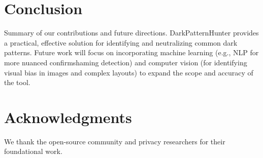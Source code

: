 \documentclass[journal]{IEEEtran}
\begin{document}
\section{Conclusion}
Summary of our contributions and future directions. DarkPatternHunter provides a practical, effective solution for identifying and neutralizing common dark patterns. Future work will focus on incorporating machine learning (e.g., NLP for more nuanced confirmshaming detection) and computer vision (for identifying visual bias in images and complex layouts) to expand the scope and accuracy of the tool.

\section*{Acknowledgments}
We thank the open-source community and privacy researchers for their foundational work.



\end{document}
